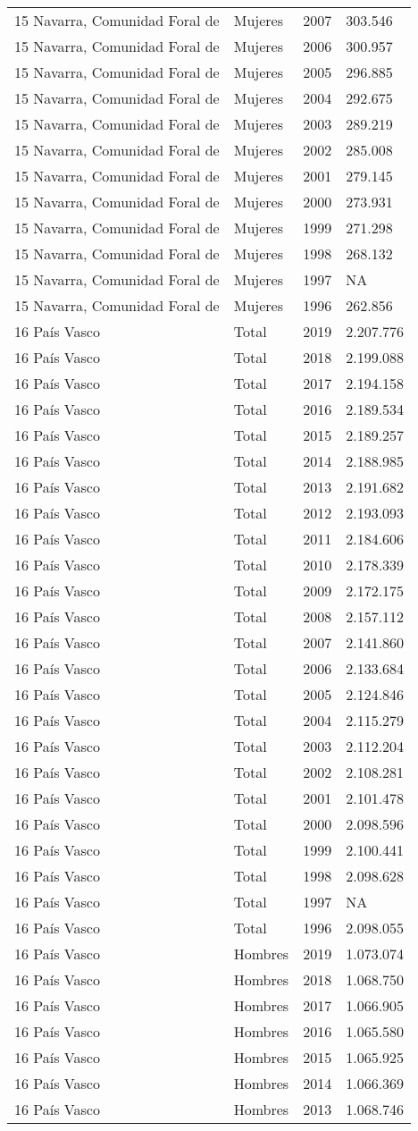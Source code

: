 \documentclass[
]{article}
\begin{document}
\begin{longtable}[]{@{}llrl@{}}
15 Navarra, Comunidad Foral de & Mujeres & 2007 & 303.546\tabularnewline
15 Navarra, Comunidad Foral de & Mujeres & 2006 & 300.957\tabularnewline
15 Navarra, Comunidad Foral de & Mujeres & 2005 & 296.885\tabularnewline
15 Navarra, Comunidad Foral de & Mujeres & 2004 & 292.675\tabularnewline
15 Navarra, Comunidad Foral de & Mujeres & 2003 & 289.219\tabularnewline
15 Navarra, Comunidad Foral de & Mujeres & 2002 & 285.008\tabularnewline
15 Navarra, Comunidad Foral de & Mujeres & 2001 & 279.145\tabularnewline
15 Navarra, Comunidad Foral de & Mujeres & 2000 & 273.931\tabularnewline
15 Navarra, Comunidad Foral de & Mujeres & 1999 & 271.298\tabularnewline
15 Navarra, Comunidad Foral de & Mujeres & 1998 & 268.132\tabularnewline
15 Navarra, Comunidad Foral de & Mujeres & 1997 & NA\tabularnewline
15 Navarra, Comunidad Foral de & Mujeres & 1996 & 262.856\tabularnewline
16 País Vasco & Total & 2019 & 2.207.776\tabularnewline
16 País Vasco & Total & 2018 & 2.199.088\tabularnewline
16 País Vasco & Total & 2017 & 2.194.158\tabularnewline
16 País Vasco & Total & 2016 & 2.189.534\tabularnewline
16 País Vasco & Total & 2015 & 2.189.257\tabularnewline
16 País Vasco & Total & 2014 & 2.188.985\tabularnewline
16 País Vasco & Total & 2013 & 2.191.682\tabularnewline
16 País Vasco & Total & 2012 & 2.193.093\tabularnewline
16 País Vasco & Total & 2011 & 2.184.606\tabularnewline
16 País Vasco & Total & 2010 & 2.178.339\tabularnewline
16 País Vasco & Total & 2009 & 2.172.175\tabularnewline
16 País Vasco & Total & 2008 & 2.157.112\tabularnewline
16 País Vasco & Total & 2007 & 2.141.860\tabularnewline
16 País Vasco & Total & 2006 & 2.133.684\tabularnewline
16 País Vasco & Total & 2005 & 2.124.846\tabularnewline
16 País Vasco & Total & 2004 & 2.115.279\tabularnewline
16 País Vasco & Total & 2003 & 2.112.204\tabularnewline
16 País Vasco & Total & 2002 & 2.108.281\tabularnewline
16 País Vasco & Total & 2001 & 2.101.478\tabularnewline
16 País Vasco & Total & 2000 & 2.098.596\tabularnewline
16 País Vasco & Total & 1999 & 2.100.441\tabularnewline
16 País Vasco & Total & 1998 & 2.098.628\tabularnewline
16 País Vasco & Total & 1997 & NA\tabularnewline
16 País Vasco & Total & 1996 & 2.098.055\tabularnewline
16 País Vasco & Hombres & 2019 & 1.073.074\tabularnewline
16 País Vasco & Hombres & 2018 & 1.068.750\tabularnewline
16 País Vasco & Hombres & 2017 & 1.066.905\tabularnewline
16 País Vasco & Hombres & 2016 & 1.065.580\tabularnewline
16 País Vasco & Hombres & 2015 & 1.065.925\tabularnewline
16 País Vasco & Hombres & 2014 & 1.066.369\tabularnewline
16 País Vasco & Hombres & 2013 & 1.068.746\tabularnewline

\end{longtable}
\end{document}
